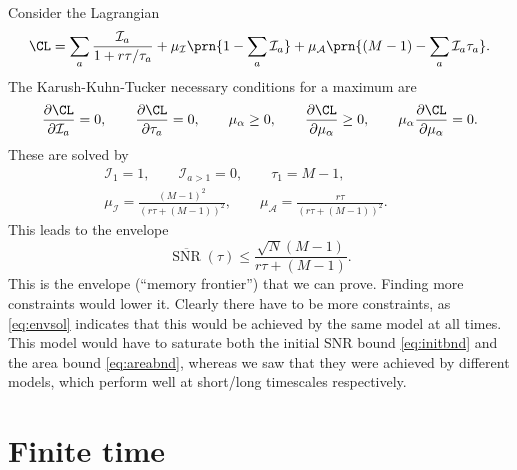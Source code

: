 \documentclass[12pt]{article}
\DeclareMathOperator{\snr}{SNR}
\newcommand{\snrb}{\overline{\snr}}
\newcommand{\CI}{\mathcal{I}}
\newcommand{\CA}{\mathcal{A}}
\renewcommand{\pdiff}[2]{\frac{\partial #1}{\partial #2}}
\begin{document}
Consider the Lagrangian
%
\begin{equation}\label{eq:envlagrangian}
  \CL = \sum_a \frac{\CI_a}{1+r\tau/\tau_a} + \mu_\CI \prn{1 - \sum_a \CI_a} + \mu_\CA \prn{(M-1) - \sum_a \CI_a \tau_a}.
\end{equation}
%
The Karush-Kuhn-Tucker necessary conditions for a maximum are
%
\begin{equation}\label{eq:envKTcond}
  \pdiff{\CL}{\CI_a} = 0, \qquad
  \pdiff{\CL}{\tau_a} = 0, \qquad
  \mu_\alpha \geq 0, \qquad
  \pdiff{\CL}{\mu_\alpha} \geq 0, \qquad
  \mu_\alpha\pdiff{\CL}{\mu_\alpha} = 0.
\end{equation}
%
These are solved by
%
\begin{equation}\label{eq:envsol}
\begin{gathered}
  \CI_1 = 1, \qquad
  \CI_{a>1} = 0, \qquad
  \tau_1 = M-1, \\
  \mu_\CI = \frac{(M-1)^2}{(r\tau + (M-1))^2}, \qquad
  \mu_\CA = \frac{r\tau}{(r\tau+(M-1))^2}. \qquad
\end{gathered}
\end{equation}
%
This leads to the envelope
%
\begin{equation}\label{eq:env}
  \snrb(\tau) \leq \frac{\sqrt{N}(M-1)}{r\tau + (M-1)}.
\end{equation}
%
This is the envelope (``memory frontier'') that we can prove.
Finding more constraints would lower it.
Clearly there have to be more constraints, as \eqref{eq:envsol} indicates that this would be achieved by the same model at all times.
This model would have to saturate both the initial SNR bound \eqref{eq:initbnd} and the area bound \eqref{eq:areabnd}, whereas we saw that they were achieved by different models, which perform well at short/long timescales respectively.



\section{Finite time}\label{sec:finite}
\end{document}
